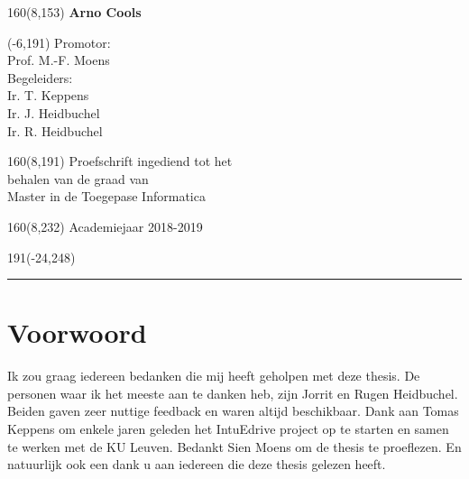 \documentclass[12pt,a4paper,oneside]{book}
\newcommand\blankpage{%
    \null
    \thispagestyle{empty}%
    \addtocounter{page}{-1}%
    \newpage}
\begin{document}
\begin{textblock}{160}(8,153)
\textblockcolour{}
\vspace{-\parskip}
\flushright
\fontsize{14}{16}\selectfont \textbf{Arno Cools}
\end{textblock}
%
\begin{textblock}{70}(-6,191)
\textblockcolour{}
\vspace{-\parskip}
\flushleft
Promotor:\\Prof. M.-F. Moens\\[-2pt]
\vspace{5mm}
Begeleiders:\\
Ir. T. Keppens\\Ir. J. Heidbuchel\\Ir. R. Heidbuchel\\[-2pt]
\end{textblock}
%
\begin{textblock}{160}(8,191)
\textblockcolour{}
\vspace{-\parskip}
\flushright
Proefschrift ingediend tot het\\[4.5pt]
behalen van de graad van\\[4.5pt]
Master in de Toegepase Informatica\\
\end{textblock}
%
\begin{textblock}{160}(8,232)
\textblockcolour{}
\vspace{-\parskip}
\flushright
Academiejaar 2018-2019
\end{textblock}
%
\begin{textblock}{191}(-24,248)
{\color{blueline}\rule{550pt}{5.5pt}}
\end{textblock}
%
\vfill
\newpage

\rmfamily
\frontmatter
\afterpage{\blankpage}
\setcounter{page}{1}
\chapter{Voorwoord}
Ik zou graag iedereen bedanken die mij heeft geholpen met deze thesis. De personen waar ik het meeste aan te danken heb, zijn Jorrit en Rugen Heidbuchel. Beiden gaven zeer nuttige feedback en waren altijd beschikbaar. Dank aan Tomas Keppens om enkele jaren geleden het IntuEdrive project op te starten en samen te werken met de KU Leuven. Bedankt Sien Moens om de thesis te proeflezen. En natuurlijk ook een dank u aan iedereen die deze thesis gelezen heeft.
\end{document}
